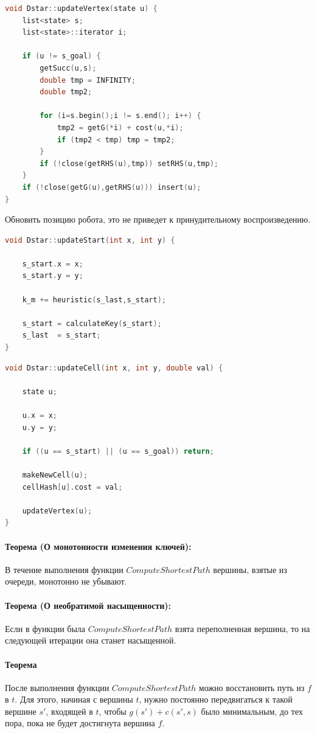 \documentclass[12pt]{article}
\begin{document}
\begin{lstlisting}[language=C,style=C]
void Dstar::updateVertex(state u) {
    list<state> s;
    list<state>::iterator i;

    if (u != s_goal) {
        getSucc(u,s);
        double tmp = INFINITY;
        double tmp2;

        for (i=s.begin();i != s.end(); i++) {
            tmp2 = getG(*i) + cost(u,*i);
            if (tmp2 < tmp) tmp = tmp2;
        }
        if (!close(getRHS(u),tmp)) setRHS(u,tmp);
    }
    if (!close(getG(u),getRHS(u))) insert(u);
}
\end{lstlisting}
Обновить позицию робота, это не приведет к принудительному воспроизведению.
\begin{lstlisting}[language=C,style=C]
void Dstar::updateStart(int x, int y) {

    s_start.x = x;
    s_start.y = y;

    k_m += heuristic(s_last,s_start);

    s_start = calculateKey(s_start);
    s_last  = s_start;
}
\end{lstlisting}


\begin{lstlisting}[language=C,style=C]
void Dstar::updateCell(int x, int y, double val) {

    state u;

    u.x = x;
    u.y = y;

    if ((u == s_start) || (u == s_goal)) return;

    makeNewCell(u);
    cellHash[u].cost = val;

    updateVertex(u);
}
\end{lstlisting}

\paragraph{Теорема (О монотонности изменения ключей):}
В течение выполнения функции $ComputeShortestPath$ вершины, взятые из очереди, монотонно не убывают.
\paragraph{Теорема (О необратимой насыщенности):}
Если в функции была $ComputeShortestPath$ взята переполненная вершина, то на следующей итерации она станет насыщенной.
\paragraph{Теорема}
После выполнения функции $ComputeShortestPath$ можно восстановить путь из $f$ в $t$. Для этого, начиная с вершины $t$, нужно постоянно передвигаться к такой вершине $s′$, входящей в $t$, чтобы $g(s′)+c(s′,s)$ было минимальным, до тех пора, пока не будет достигнута вершина $f$.
\end{document}
